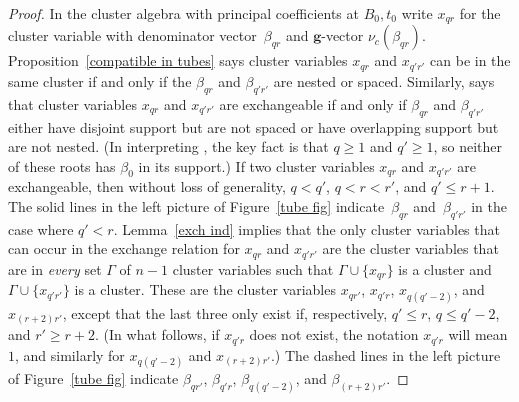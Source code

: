 \documentclass[10pt]{article}
\theoremstyle{definition}
\theoremstyle{remark}
\numberwithin{equation}{section}
\newcommand{\set}[1]{{\lbrace #1 \rbrace}}
\newcommand{\0}{{\mathbf{0}}}
\newcommand{\g}{\mathbf{g}}
\begin{document}
\begin{proof}
In the cluster algebra with principal coefficients at $B_0,t_0$ write $x_{qr}$ for the cluster variable with denominator vector~$\beta_{qr}$ and $\g$-vector $\nu_c(\beta_{qr})$.
Proposition~\ref{compatible in tubes} says cluster variables $x_{qr}$ and $x_{q'r'}$ can be in the same cluster if and only if the $\beta_{qr}$ and $\beta_{q'r'}$ are nested or spaced.
Similarly, \cite[Theorem~7.2]{affdenom} says that cluster variables $x_{qr}$ and $x_{q'r'}$ are exchangeable if and only if $\beta_{qr}$ and $\beta_{q'r'}$ either have disjoint support but are not spaced or have overlapping support but are not nested.
(In interpreting \cite[Theorem~7.2]{affdenom}, the key fact is that $q\ge1$ and $q'\ge 1$, so neither of these roots has $\beta_0$ in its support.)
If two cluster variables $x_{qr}$ and $x_{q'r'}$ are exchangeable, then without loss of generality, $q<q'$, $q<r<r'$, and $q'\le r+1$.
The solid lines in the left picture of Figure~\ref{tube fig} indicate~$\beta_{qr}$ and~$\beta_{q'r'}$ in the case where $q'<r$.
Lemma~\ref{exch ind} implies that the only cluster variables that can occur in the exchange relation for $x_{qr}$ and $x_{q'r'}$ are the cluster variables that are in \emph{every} set $\Gamma$ of $n-1$ cluster variables such that $\Gamma\cup\set{x_{qr}}$ is a cluster and $\Gamma\cup\set{x_{q'r'}}$ is a cluster.
These are the cluster variables $x_{qr'}$, $x_{q'r}$, $x_{q(q'-2)}$, and $x_{(r+2)r'}$, except that the last three only exist if, respectively, $q'\le r$, $q\le q'-2$, and $r'\ge r+2$.
(In what follows, if $x_{q'r}$ does not exist, the notation $x_{q'r}$ will mean $1$, and similarly for $x_{q(q'-2)}$ and $x_{(r+2)r'}$.)
The dashed lines in the left picture of Figure~\ref{tube fig} indicate $\beta_{qr'}$, $\beta_{q'r}$, $\beta_{q(q'-2)}$, and $\beta_{(r+2)r'}$.


\end{proof}
\end{document}
